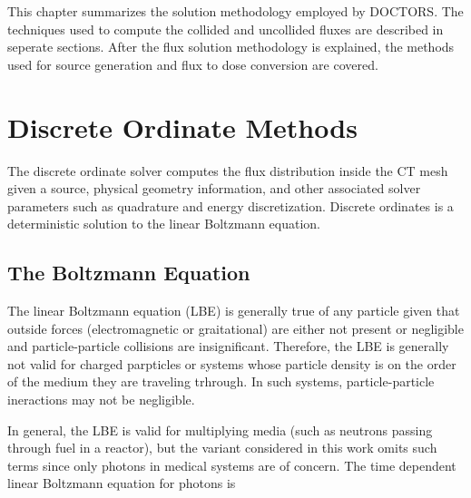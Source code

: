 
This chapter summarizes the solution methodology employed by DOCTORS. The techniques used to compute the collided and uncollided fluxes are described in seperate sections. After the flux solution methodology is explained, the methods used for source generation and flux to dose conversion are covered.

\section{Discrete Ordinate Methods}

The discrete ordinate solver computes the flux distribution inside the CT mesh given a source, physical geometry information, and other associated solver parameters such as quadrature and energy discretization. Discrete ordinates is a deterministic solution to the linear Boltzmann equation.

\subsection{The Boltzmann Equation}

The linear Boltzmann equation (LBE) is generally true of any particle given that outside forces (electromagnetic or graitational) are either not present or negligible and particle-particle collisions are insignificant. Therefore, the LBE is generally not valid for charged parpticles or systems whose particle density is on the order of the medium they are traveling trhrough. In such systems, particle-particle ineractions may not be negligible.  

In general, the LBE is valid for multiplying media (such as neutrons passing through fuel in a reactor), but the variant considered in this work omits such terms since only photons in medical systems are of concern. The time dependent linear Boltzmann equation for photons is

